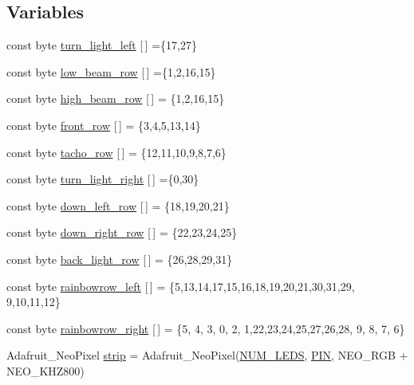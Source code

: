 \subsection*{Variables}
\begin{DoxyCompactItemize}
\item 
const byte \hyperlink{group__deployment_gac03fd0ab9cbcc53730039ad03e9b094d}{turn\+\_\+light\+\_\+left} \mbox{[}$\,$\mbox{]} =\{17,27\}
\item 
const byte \hyperlink{group__deployment_ga1a25903a2850d9849775664473070489}{low\+\_\+beam\+\_\+row} \mbox{[}$\,$\mbox{]} =\{1,2,16,15\}
\item 
const byte \hyperlink{group__deployment_ga1ecea646e1c5dcdfc643287a5f2041bb}{high\+\_\+beam\+\_\+row} \mbox{[}$\,$\mbox{]} = \{1,2,16,15\}
\item 
const byte \hyperlink{group__deployment_ga5009aa0cbe6b32a72b085489b027800e}{front\+\_\+row} \mbox{[}$\,$\mbox{]} = \{3,4,5,13,14\}
\item 
const byte \hyperlink{group__deployment_ga6ade605406f4c1ce9f03a5a2530f6dbe}{tacho\+\_\+row} \mbox{[}$\,$\mbox{]} = \{12,11,10,9,8,7,6\}
\item 
const byte \hyperlink{group__deployment_gaa5a6ee27fdf1d7c939cdf2a7266d7e84}{turn\+\_\+light\+\_\+right} \mbox{[}$\,$\mbox{]} =\{0,30\}
\item 
const byte \hyperlink{group__deployment_gaac36c9836edd3a125668213f0fb72b5a}{down\+\_\+left\+\_\+row} \mbox{[}$\,$\mbox{]} = \{18,19,20,21\}
\item 
const byte \hyperlink{group__deployment_gadbf10ff9ee353128c568e07c32b1ffa9}{down\+\_\+right\+\_\+row} \mbox{[}$\,$\mbox{]} = \{22,23,24,25\}
\item 
const byte \hyperlink{group__deployment_ga516415cfaebc59b71f822fb4cf86b22c}{back\+\_\+light\+\_\+row} \mbox{[}$\,$\mbox{]} = \{26,28,29,31\}
\item 
const byte \hyperlink{group__deployment_gad4e8497757364dbc8187298bd87acc44}{rainbowrow\+\_\+left} \mbox{[}$\,$\mbox{]} = \{5,13,14,17,15,16,18,19,20,21,30,31,29, 9,10,11,12\}
\item 
const byte \hyperlink{group__deployment_ga00c047fede9a8b6c020ba1d108d63cea}{rainbowrow\+\_\+right} \mbox{[}$\,$\mbox{]} = \{5, 4, 3, 0, 2, 1,22,23,24,25,27,26,28, 9, 8, 7, 6\}
\item 
Adafruit\+\_\+\+Neo\+Pixel \hyperlink{group__deployment_gacf2771bd8bfaf855bbcc6c30301bf380}{strip} = Adafruit\+\_\+\+Neo\+Pixel(\hyperlink{group__deployment_ga4c4ae9a4146ce8d6a5debc90300d9abd}{N\+U\+M\+\_\+\+L\+E\+DS}, \hyperlink{group__deployment_gae1a27401b7fb01ccb9a82dbddbb54eea}{P\+IN}, N\+E\+O\+\_\+\+R\+GB + N\+E\+O\+\_\+\+K\+H\+Z800)
\end{DoxyCompactItemize}


